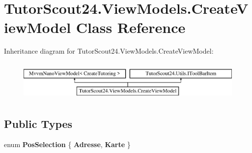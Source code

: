 \hypertarget{class_tutor_scout24_1_1_view_models_1_1_create_view_model}{}\section{Tutor\+Scout24.\+View\+Models.\+Create\+View\+Model Class Reference}
\label{class_tutor_scout24_1_1_view_models_1_1_create_view_model}
Inheritance diagram for Tutor\+Scout24.\+View\+Models.\+Create\+View\+Model\+:\begin{figure}[H]
\begin{center}
\leavevmode
\includegraphics[height=2.000000cm]{class_tutor_scout24_1_1_view_models_1_1_create_view_model}
\end{center}
\end{figure}
\subsection*{Public Types}
\begin{DoxyCompactItemize}
\item 
\mbox{\label{class_tutor_scout24_1_1_view_models_1_1_create_view_model_a2cdbfdb58688e57fa4a3f6a24cf6af68}} 
enum {\bfseries Pos\+Selection} \{ {\bfseries Adresse}, 
{\bfseries Karte}
 \}
\end{DoxyCompactItemize}
